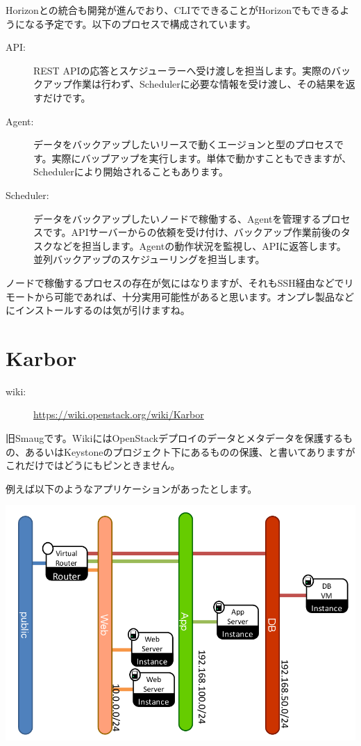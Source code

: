Horizonとの統合も開発が進んでおり、CLIでできることがHorizonでもできるようになる予定です。以下のプロセスで構成されています。

\begin{description}
	\item[API:] REST APIの応答とスケジューラーへ受け渡しを担当します。実際のバックアップ作業は行わず、Schedulerに必要な情報を受け渡し、その結果を返すだけです。
	\item[Agent:] データをバックアップしたいリースで動くエージョンと型のプロセスです。実際にバップアップを実行します。単体で動かすこともできますが、Schedulerにより開始されることもあります。
	\item[Scheduler:] データをバックアップしたいノードで稼働する、Agentを管理するプロセスです。APIサーバーからの依頼を受け付け、バックアップ作業前後のタスクなどを担当します。Agentの動作状況を監視し、APIに返答します。並列バックアップのスケジューリングを担当します。
\end{description}

ノードで稼働するプロセスの存在が気にはなりますが、それもSSH経由などでリモートから可能であれば、十分実用可能性があると思います。オンプレ製品などにインストールするのは気が引けますね。

\section{Karbor}

\begin{description}
	\item[wiki:] \url{https://wiki.openstack.org/wiki/Karbor}
\end{description}

旧Smaugです。WikiにはOpenStackデプロイのデータとメタデータを保護するもの、あるいはKeystoneのプロジェクト下にあるものの保護、と書いてありますがこれだけではどうにもピンときません。

例えば以下のようなアプリケーションがあったとします。

\includegraphics[width=\textwidth]{img/Smaug-sample-application.png}

